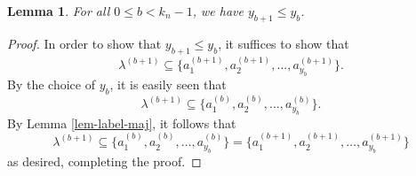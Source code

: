 \documentclass[12pt]{article}
\numberwithin{equation}{section}
\theoremstyle{plain}
\newtheorem{lemma}[theorem]{Lemma}
\begin{document}
  
  
  \begin{lemma}\label{lem-y_b-maj}
  	For all $0\leq b<k_n-1$, we have $y_{b+1}\leq y_{b}$. 
  \end{lemma}
  \begin{proof}
  	In order to show that 
  	$y_{b+1}\leq y_b$, it suffices to show that $$\lambda^{(b+1)}\subseteq \{a^{(b+1)}_{1}, a^{(b+1)}_2, \ldots, a^{(b+1)}_{y_b}\}.$$      By the choice of $y_b$, it is easily seen that
  	$$
  	\lambda^{(b+1)} \subseteq \{a^{(b)}_{1}, a^{(b)}_2, \ldots, a^{(b)}_{y_b}\}. 
  	$$
  By	Lemma \ref{lem-label-maj}, it follows that
  $$\lambda^{(b+1)}\subseteq \{a^{(b)}_{1}, a^{(b)}_2, \ldots, a^{(b)}_{y_b}\}=\{a^{(b+1)}_{1}, a^{(b+1)}_2, \ldots, a^{(b+1)}_{y_b}\} $$ as desired, completing the proof.  
  \end{proof}
  
  
  
\end{document}
